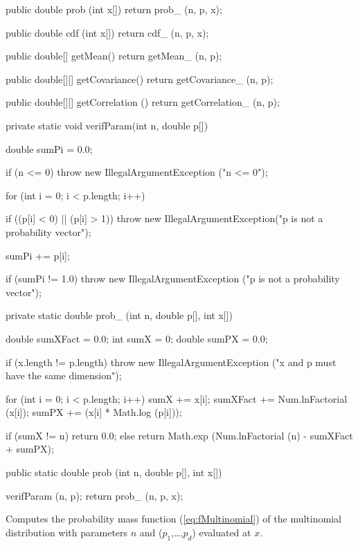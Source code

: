 \begin{code}\begin{hide}
   public double prob (int x[]) {
      return prob_ (n, p, x);
   }

   public double cdf (int x[]) {
      return cdf_ (n, p, x);
   }

   public double[] getMean() {
      return getMean_ (n, p);
   }

   public double[][] getCovariance() {
      return getCovariance_ (n, p);
   }

   public double[][] getCorrelation () {
      return getCorrelation_ (n, p);
   }

   private static void verifParam(int n, double p[]) {
      double sumPi = 0.0;

      if (n <= 0)
         throw new IllegalArgumentException ("n <= 0");

      for (int i = 0; i < p.length; i++)
      {
         if ((p[i] < 0) || (p[i] > 1))
            throw new IllegalArgumentException("p is not a probability vector");

         sumPi += p[i];
      }

      if (sumPi != 1.0)
         throw new IllegalArgumentException ("p is not a probability vector");
   }

   private static double prob_ (int n, double p[], int x[]) {
      double sumXFact = 0.0;
      int sumX = 0;
      double sumPX = 0.0;

      if (x.length != p.length)
         throw new IllegalArgumentException ("x and p must have the same dimension");

      for (int i = 0; i < p.length; i++)
      {
         sumX += x[i];
         sumXFact += Num.lnFactorial (x[i]);
         sumPX += (x[i] * Math.log (p[i]));
      }

      if (sumX != n)
         return 0.0;
      else
      {
         return Math.exp (Num.lnFactorial (n) - sumXFact + sumPX);
      }
   }
\end{hide}

   public static double prob (int n, double p[], int x[])\begin{hide} {
      verifParam (n, p);
      return prob_ (n, p, x);
   }\end{hide}
\end{code}
\begin{tabb}
   Computes the probability mass function (\ref{eq:fMultinomial})
   of the multinomial distribution with parameters $n$ and
   ($p_1$,\ldots,$p_d$) evaluated at $x$.
\end{tabb}
